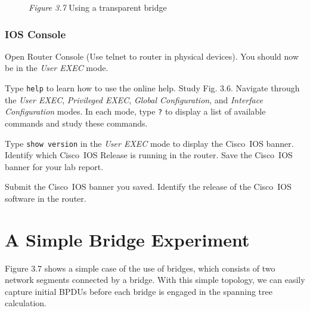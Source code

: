 \documentclass{../UTNetLab}
\begin{document}
    \begin{figure}[H]
        \centering
        \caption{\textit{Figure 3.7} Using a transparent bridge}
    \end{figure}

\section{IOS Console}
    Open Router Console (Use telnet to router in physical devices).
    You should now be in the \textit{User EXEC} mode.

    Type \lstinline[language={cisco}]{help} to learn how to use the online help.
    Study Fig. 3.6. Navigate through the \textit{User EXEC}, \textit{Privileged EXEC}, \textit{Global Configuration}, and \textit{Interface Configuration} modes. In each mode, type \lstinline[language={cisco}]{?} to display a list of available commands and study these commands.

    Type \lstinline[language={cisco}]{show version} in the \textit{User EXEC} mode to display the Cisco~IOS banner.
    Identify which Cisco~IOS Release is running in the router.
    Save the Cisco~IOS banner for your lab report.
    
    \begin{report}
    \item Submit the Cisco~IOS banner you saved.
    Identify the release of the Cisco~IOS software in the router.
    \end{report}

\part{A Simple Bridge Experiment}
    Figure 3.7 shows a simple case of the use of bridges, which consists of two network segments connected by a bridge.
    With this simple topology, we can easily capture initial BPDUs before each bridge is engaged in the spanning tree calculation.
\end{document}
